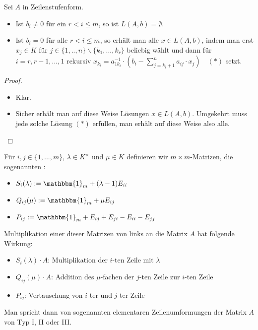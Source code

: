 \begin{proposition}
	Sei $A$ in Zeilenstufenform.
	\begin{itemize}
		\item Ist $b_i\neq 0$ für ein $r<i\le m$, so ist $L(A,b)=\emptyset$.
		\item Ist $b_i=0$ für alle $r<i\le m$, so erhält man alle $x\in L(A,b)$, indem man erst $x_j\in K$ für $j\in \{1,..,n\}
		\backslash \{k_1,...,k_r\}$ beliebig wählt und dann für $i=r,r-1,...,1$ rekursiv $x_{k_{i}}=a_{1k_{i}}^{-1}\cdot (b_i-\sum
		_{j=k_i+1}^n a_{ij}\cdot x_j)\quad (*)$ setzt.
	\end{itemize}
\end{proposition}
\begin{proof}
	\begin{itemize}
		\item Klar.
		\item Sicher erhält man auf diese Weise Lösungen $x\in L(A,b)$. Umgekehrt muss jede solche Lösung $(*)$ erfüllen, man erhält auf 
		diese Weise also alle.
	\end{itemize}
\end{proof}

\begin{definition}[Elementarmatrizen]
	Für $i,j\in \{1,...,m\}$, $\lambda \in K^{\times}$ und $\mu\in K$ definieren wir 
	$m\times m$-Matrizen, die sogenannten :
	\begin{itemize}
		\item $S_i(\lambda):=\mathbbm{1}_m + (\lambda-1)E_{ii}$
		\item $Q_{ij}(\mu):= \mathbbm{1}_m + \mu E_{ij}$
		\item $P_{ij}:= \mathbbm{1}_m + E_{ij} + E_{ji} - E_{ii} - E_{jj}$
	\end{itemize}
\end{definition}

\begin{remark}
	Multiplikation einer dieser Matrizen von links an die Matrix $A$ hat folgende Wirkung:
	\begin{itemize}
		\item $S_i(\lambda)\cdot A$: Multiplikation der $i$-ten Zeile mit $\lambda$
		\item $Q_{ij}(\mu)\cdot A$: Addition des $\mu$-fachen der $j$-ten Zeile zur $i$-ten Zeile
		\item $P_{ij}$: Vertauschung von $i$-ter und $j$-ter Zeile
	\end{itemize}
	Man spricht dann von sogenannten elementaren Zeilenumformungen der Matrix $A$ von Typ I, II oder III.
\end{remark}

